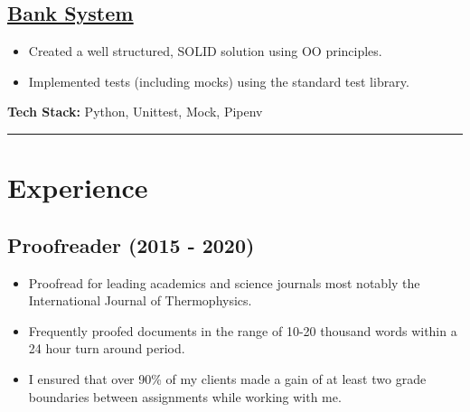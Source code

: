 \documentclass[12pt]{IEEEtran}
\newcommand{\cvrule}{\noindent\rule{8.5cm}{0.4pt}}
\begin{document}
{
\color{blue}
\subsection*{\href{https://github.com/dpwdec/bank-tech-test}{\underline{Bank System}}}
}
\begin{itemize}[topsep=\parskip]
\item Created a well structured, SOLID solution using OO principles.
\item Implemented tests (including mocks) using the standard test library.
\end{itemize}
\textbf{Tech Stack:} Python, Unittest, Mock, Pipenv

\iffalse
\vskip 1in
\lipsum[1-2]
\vfill\null
\columnbreak
\fi

\cvrule


\section*{\textbf{Experience}}

\subsection*{Proofreader (2015 - 2020)}
\begin{itemize}[topsep=\parskip]
\item Proofread for leading academics and science journals most notably the International Journal of Thermophysics.
\item Frequently proofed documents in the range of 10-20 thousand words within a 24 hour turn around period.
\item I ensured that over 90\% of my clients made a gain of at least two grade boundaries between assignments while working with me.
\end{itemize}

\end{document}
